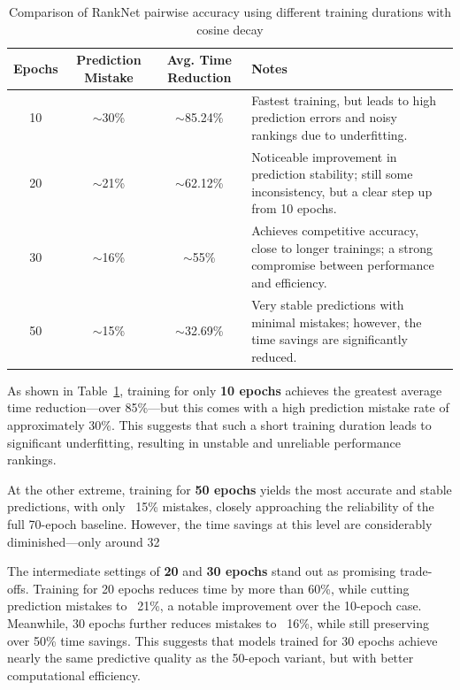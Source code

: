 \begin{table}[h]
\centering
\begin{tabular}{|c|c|c|p{6cm}|}
\hline
\textbf{Epochs} & \textbf{Prediction Mistake} & \textbf{Avg. Time Reduction} & \textbf{Notes} \\
\hline
10 & $\sim$30\% & $\sim$85.24\% & Fastest training, but leads to high prediction errors and noisy rankings due to underfitting. \\
20 & $\sim$21\% & $\sim$62.12\% & Noticeable improvement in prediction stability; still some inconsistency, but a clear step up from 10 epochs. \\
30 & $\sim$16\% & $\sim$55\% & Achieves competitive accuracy, close to longer trainings; a strong compromise between performance and efficiency. \\
50 & $\sim$15\% & $\sim$32.69\% & Very stable predictions with minimal mistakes; however, the time savings are significantly reduced. \\
\hline
\end{tabular}
\caption{Comparison of RankNet pairwise accuracy using different training durations with cosine decay}
\label{tab:cosine_decay_results}
\end{table}

\clearpage

As shown in Table~\ref{tab:cosine_decay_results}, training for only \textbf{10 epochs} achieves the greatest average time reduction—over 85\%—but this comes with a high prediction mistake rate of approximately 30\%. This suggests that such a short training duration leads to significant underfitting, resulting in unstable and unreliable performance rankings.

At the other extreme, training for \textbf{50 epochs} yields the most accurate and stable predictions, with only ~15\% mistakes, closely approaching the reliability of the full 70-epoch baseline. However, the time savings at this level are considerably diminished—only around 32%

The intermediate settings of \textbf{20} and \textbf{30 epochs} stand out as promising trade-offs. Training for 20 epochs reduces time by more than 60\%, while cutting prediction mistakes to ~21\%, a notable improvement over the 10-epoch case. Meanwhile, 30 epochs further reduces mistakes to ~16\%, while still preserving over 50\% time savings. This suggests that models trained for 30 epochs achieve nearly the same predictive quality as the 50-epoch variant, but with better computational efficiency.


